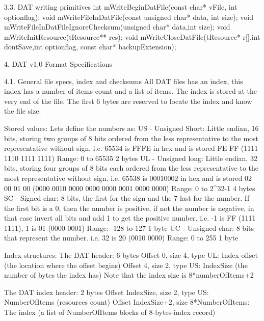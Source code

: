 3.3. DAT writing primitives
 int  mWriteBeginDatFile(const char* vFile, int optionflag);
 void mWriteFileInDatFile(const unsigned char* data, int size);
 void mWriteFileInDatFileIgnoreChecksum(unsigned char* data,int size);
 void mWriteInitResource(tResource** res);
 void mWriteCloseDatFile(tResource* r[],int dontSave,int optionflag, const
      char* backupExtension);


4. DAT v1.0 Format Specifications
   ~~~ ~~~~ ~~~~~~ ~~~~~~~~~~~~~~

4.1. General file specs, index and checksums
 All DAT files has an index, this index has a number of items count and
 a list of items.
 The index is stored at the very end of the file.
 The first 6 bytes are reserved to locate the index and know the file size.

 Stored values:
 Lets define the numbers as:
  US - Unsigned Short: Little endian, 16 bits, storing two groups of 8 bits
       ordered from the less representative to the most representative
       without sign.
       i.e. 65534 is FFFE in hex and is stored FE FF (1111 1110 1111 1111)
       Range: 0 to 65535
       2 bytes
  UL - Unsigned long: Little endian, 32 bits, storing four groups of 8 bits
       each ordered from the less representative to the most representative
       without sign.
       i.e. 65538 is 00010002 in hex and is stored 02 00 01 00
       (0000 0010 0000 0000 0000 0001 0000 0000)
       Range: 0 to 2^32-1
       4 bytes
  SC - Signed char: 8 bits, the first for the sign and the 7 last for the
       number. If the first bit is a 0, then the number is positive, if not
       the number is negative, in that case invert all bits and add 1 to
       get the positive number.
       i.e. -1 is FF (1111 1111), 1 is 01 (0000 0001)
       Range: -128 to 127
       1 byte
  UC - Unsigned char: 8 bits that represent the number.
       i.e. 32 is 20 (0010 0000)
       Range: 0 to 255
       1 byte

 Index structures:
 The DAT header: 6 bytes
  Offset 0, size 4, type UL: Index offset (the location where the offset
                             begins)
  Offset 4, size 2, type US: IndexSize (the number of bytes the index has)
                             Note that the index size is 8*numberOfItems+2

 The DAT index header: 2 bytes
  Offset IndexSize, size 2, type US: NumberOfItems (resources count)
  Offset IndexSize+2, size 8*NumberOfItems: The index (a list of
                              NumberOfItems blocks of 8-bytes-index record)

